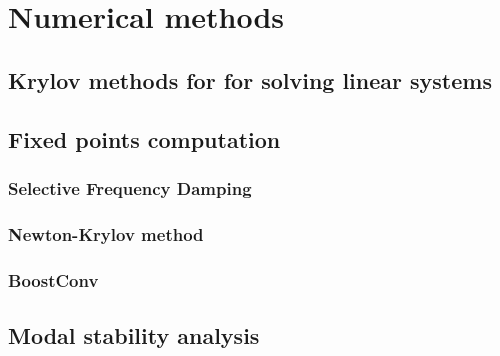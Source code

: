 \section{Numerical methods}
\label{sec: numerics}


  \subsection{Krylov methods for for solving linear systems}
  \label{subsubsec: theory -- krylov methods}




  \subsection{Fixed points computation}
  \label{subsec: numerics-fixed points computation}
    \subsubsection{Selective Frequency Damping}

    \subsubsection{Newton-Krylov method}

    \subsubsection{BoostConv}





  \subsection{Modal stability analysis}

